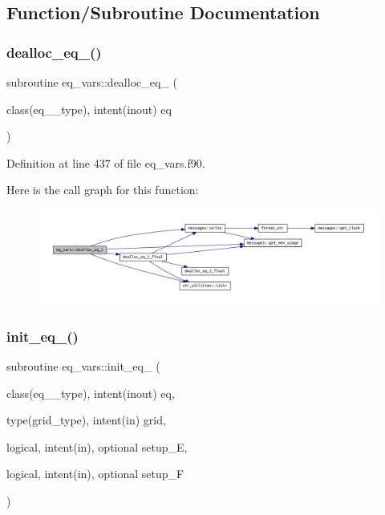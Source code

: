 \subsection{Function/\+Subroutine Documentation}
\mbox{\label{namespaceeq__vars_ab106dc007ddc896092d0464233b3ce12}} 
\subsubsection{\texorpdfstring{dealloc\+\_\+eq\+\_()}{dealloc\_eq\_1()}}
{\footnotesize\ttfamily subroutine eq\+\_\+vars\+::dealloc\+\_\+eq\+\_ (\begin{DoxyParamCaption}\item[{class(eq\+\_\+1\+\_\+type), intent(inout)}]{eq }\end{DoxyParamCaption})}



Definition at line 437 of file eq\+\_\+vars.\+f90.

Here is the call graph for this function\+:
\nopagebreak
\begin{figure}[H]
\begin{center}
\leavevmode
\includegraphics[width=350pt]{namespaceeq__vars_ab106dc007ddc896092d0464233b3ce12_cgraph}
\end{center}
\end{figure}
\mbox{\label{namespaceeq__vars_a93947b772250ef73b25bde7688b33bc2}} 
\subsubsection{\texorpdfstring{init\+\_\+eq\+\_()}{init\_eq\_2()}}
{\footnotesize\ttfamily subroutine eq\+\_\+vars\+::init\+\_\+eq\+\_ (\begin{DoxyParamCaption}\item[{class(eq\+\_\+2\+\_\+type), intent(inout)}]{eq,  }\item[{type(grid\+\_\+type), intent(in)}]{grid,  }\item[{logical, intent(in), optional}]{setup\+\_\+E,  }\item[{logical, intent(in), optional}]{setup\+\_\+F }\end{DoxyParamCaption})}



